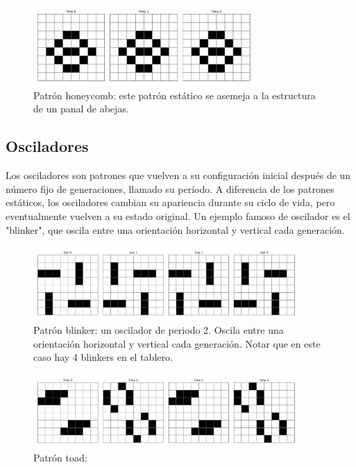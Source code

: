 \documentclass[]{article}
\begin{document}
\begin{figure}[H]
  \centering
  \includegraphics[width=0.75\textwidth]{../assets/still_life/honeycomb/honeycomb.png}
  \caption{Patrón honeycomb: este patrón estático se asemeja a la estructura de un panal de abejas.}
  \label{fig:honeycomb}
  \end{figure}

\subsection{Osciladores}
Los osciladores son patrones que vuelven a su configuración inicial después de un número fijo de generaciones, llamado su período. A diferencia de los patrones estáticos, los osciladores cambian su apariencia durante su ciclo de vida, pero eventualmente vuelven a su estado original. Un ejemplo famoso de oscilador es el "blinker", que oscila entre una orientación horizontal y vertical cada generación.

\begin{figure}[H]
  \centering
  \includegraphics[width=0.9\textwidth]{../assets/oscillator/blinker/blinker.png}
  \caption{Patrón blinker: un oscilador de periodo 2. Oscila entre una orientación horizontal y vertical cada generación. Notar que en este caso hay 4 blinkers en el tablero.}
  \label{fig:blinker}
  \end{figure}

  \begin{figure}[H]
    \centering
    \includegraphics[width=0.9\textwidth]{../assets/oscillator/toad/toad.png}
    \caption{Patrón toad: }
    \label{fig:toad}
    \end{figure}
\end{document}
